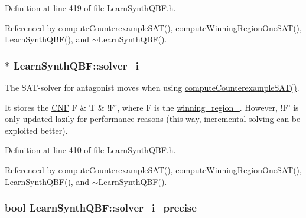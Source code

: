 Definition at line 419 of file Learn\-Synth\-Q\-B\-F.\-h.



Referenced by compute\-Counterexample\-S\-A\-T(), compute\-Winning\-Region\-One\-S\-A\-T(), Learn\-Synth\-Q\-B\-F(), and $\sim$\-Learn\-Synth\-Q\-B\-F().

\hypertarget{classLearnSynthQBF_ada2e8c87c0ca0d83c484d6181ea5a788}{
\subsubsection[{solver\-\_\-i\-\_\-}]{$\ast$ Learn\-Synth\-Q\-B\-F\-::solver\-\_\-i\-\_\-\hspace{0.3cm}{\ttfamily [protected]}}}\label{classLearnSynthQBF_ada2e8c87c0ca0d83c484d6181ea5a788}


The S\-A\-T-\/solver for antagonist moves when using \hyperlink{classLearnSynthQBF_a3221800bf3f040b66b8a790bab4c82b5}{compute\-Counterexample\-S\-A\-T()}. 

It stores the \hyperlink{classCNF}{C\-N\-F} F \& T \& !\-F', where F is the \hyperlink{classLearnSynthQBF_a9c6b41f7df5f4ed4bfc5930136fc1152}{winning\-\_\-region\-\_\-}. However, !\-F' is only updated lazily for performance reasons (this way, incremental solving can be exploited better). 

Definition at line 410 of file Learn\-Synth\-Q\-B\-F.\-h.



Referenced by compute\-Counterexample\-S\-A\-T(), compute\-Winning\-Region\-One\-S\-A\-T(), Learn\-Synth\-Q\-B\-F(), and $\sim$\-Learn\-Synth\-Q\-B\-F().

\hypertarget{classLearnSynthQBF_ae65774a2b9e6137d6ff45cbf755d4843}{
\subsubsection[{solver\-\_\-i\-\_\-precise\-\_\-}]{\setlength{\rightskip}{0pt plus 5cm}bool Learn\-Synth\-Q\-B\-F\-::solver\-\_\-i\-\_\-precise\-\_\-\hspace{0.3cm}{\ttfamily [protected]}}}\label{classLearnSynthQBF_ae65774a2b9e6137d6ff45cbf755d4843}


